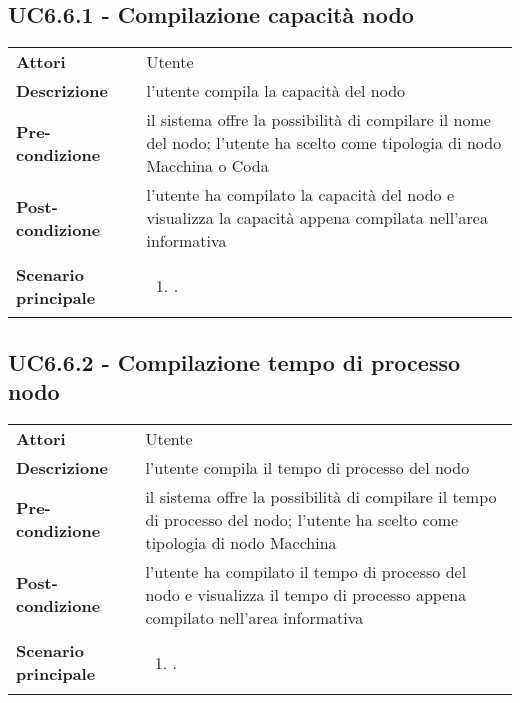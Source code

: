 \subsection{UC6.6.1 - Compilazione capacità nodo} 
\label{sssec:UC6.6.1} 
\def\arraystretch{1.5}
\begin{tabularx}{\textwidth}{l|p{}}
	\rowcolor{I} \multicolumn{2}{c}{\color{white}\textbf{UC6.6.1 - Compilazione capacità nodo}} \\
	\toprule
	\endhead
	\textbf{Attori} & Utente\\
	\textbf{Descrizione} & l'utente compila la capacità del nodo\\
	\textbf{Pre-condizione} & il sistema offre la possibilità di compilare il nome del nodo; l'utente ha scelto come tipologia di nodo Macchina o Coda\\
	\textbf{Post-condizione} & l'utente ha compilato la capacità del nodo e visualizza la capacità appena compilata nell'area informativa\\
	\textbf{Scenario principale} & \vspace{-1.2em}\begin{enumerate}[leftmargin=*,noitemsep,nosep]
		\item \nameref{sssec:UC6.6.1}.
	\end{enumerate}\\
	\bottomrule
\end{tabularx}
\subsection{UC6.6.2 - Compilazione tempo di processo nodo} 
\label{sssec:UC6.6.2} 
\def\arraystretch{1.5}
\begin{tabularx}{\textwidth}{l|p{}}
	\rowcolor{I} \multicolumn{2}{c}{\color{white}\textbf{UC6.6.2 - Compilazione tempo di processo nodo}} \\
	\toprule
	\endhead
	\textbf{Attori} & Utente\\
	\textbf{Descrizione} & l'utente compila il tempo di processo del nodo\\
	\textbf{Pre-condizione} & il sistema offre la possibilità di compilare il tempo di processo del nodo; l'utente ha scelto come tipologia di nodo Macchina\\
	\textbf{Post-condizione} & l'utente ha compilato il tempo di processo del nodo e visualizza il tempo di processo appena compilato nell'area informativa\\
	\textbf{Scenario principale} & \vspace{-1.2em}\begin{enumerate}[leftmargin=*,noitemsep,nosep]
		\item \nameref{sssec:UC6.6.2}.
	\end{enumerate}\\
	\bottomrule
\end{tabularx}

